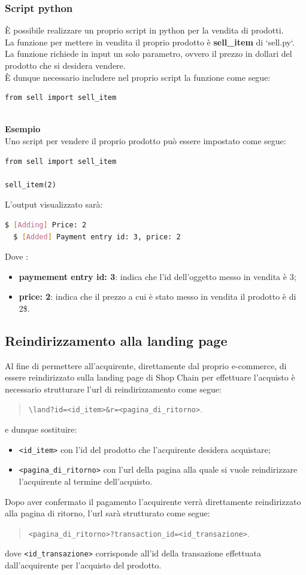 \documentclass[a4paper, 12pt]{article}
\begin{document}
\subsubsection{Script python}
È possibile realizzare un proprio script in python per la vendita di prodotti.\\
La funzione per mettere in vendita il proprio prodotto è \textbf{sell\_item} di `sell.py`. La funzione richiede in input un solo parametro, ovvero il prezzo in dollari del prodotto che si desidera vendere.\\
È dunque necessario includere nel proprio script la funzione come segue:
\begin{verbatim}
from sell import sell_item
\end{verbatim}
\mbox{}\\
\textbf{Esempio}
\\
Uno script per vendere il proprio prodotto può essere impostato come segue:
\begin{verbatim}
from sell import sell_item

sell_item(2)
\end{verbatim}
L'output visualizzato sarà:
\begin{lstlisting}[language=bash]
  $ [Adding] Price: 2
  $ [Added] Payment entry id: 3, price: 2
\end{lstlisting}
Dove :
\begin{itemize}
  \item \textbf{paymement entry id: 3}: indica che l'id dell'oggetto messo in vendita è 3;
  \item \textbf{price: 2}: indica che il prezzo a cui è stato messo in vendita il prodotto è di 2\$.
\end{itemize}
\subsection{Reindirizzamento alla landing page}
Al fine di permettere all'acquirente, direttamente dal proprio e-commerce, di essere reindirizzato sulla landing page di Shop Chain per effettuare l'acquisto è necessario strutturare l'url di reindirizzamento come segue:
\begin{quote}
  \verb|\land?id=<id_item>&r=<pagina_di_ritorno>|.
\end{quote}
e dunque sostituire:
\begin{itemize}
  \item \verb|<id_item>| con l'id del prodotto che l'acquirente desidera acquistare;
  \item \verb|<pagina_di_ritorno>| con l'url della pagina alla quale si vuole reindirizzare l'acquirente al termine dell'acquisto.
\end{itemize}
Dopo aver confermato il pagamento l'acquirente verrà direttamente reindirizzato alla pagina di ritorno, l'url sarà strutturato come segue:
\begin{quote}
  \verb|<pagina_di_ritorno>?transaction_id=<id_transazione>|.
\end{quote}
dove \verb|<id_transazione>| corrisponde all'id della transazione effettuata dall'acquirente per l'acquisto del prodotto.
\end{document}
